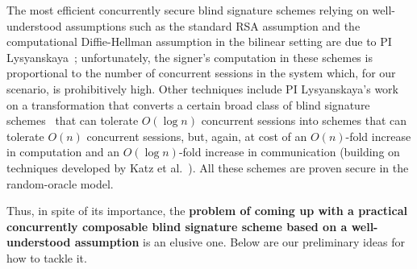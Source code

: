 The most efficient concurrently secure blind signature schemes relying on well-understood assumptions such as the standard RSA assumption and the computational Diffie-Hellman assumption in the bilinear setting are due to PI Lysyanskaya~\cite{chllw22}; unfortunately, the signer's computation in these schemes is proportional to the number of concurrent sessions in the system which, for our scenario, is prohibitively high. 
Other techniques include PI Lysyanskaya's work~\cite{chllw22} on a transformation that converts a certain broad class of blind signature schemes~\cite{EC:HauKilLos19} that can tolerate $O(\log n)$ concurrent sessions into schemes that can tolerate $O(n)$ concurrent sessions, but, again, at cost of an $O(n)$-fold increase in computation and an $O(\log n)$-fold increase in communication (building on techniques developed by Katz et al.~\cite{AC:KatLosRos21}).  All these schemes are proven secure in the random-oracle model.

Thus, in spite of its importance, the \textbf{problem of coming up with a practical concurrently composable blind signature scheme based on a well-understood assumption} is an elusive one.  Below are our preliminary ideas for how to tackle it.

